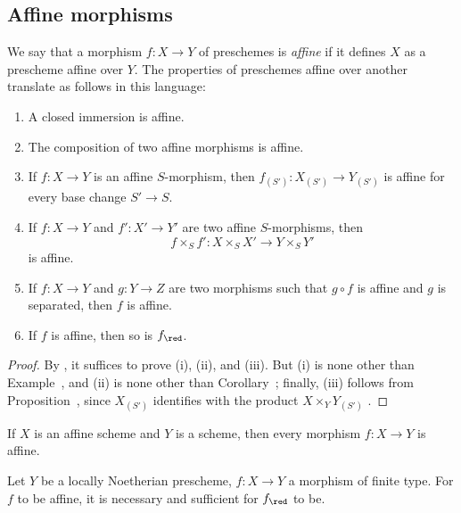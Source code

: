 \subsection{Affine morphisms}
\label{subsection:II.1.6}

\begin{env}[1.6.1]
\label{II.1.6.1}
We say that a morphism $f:X\to Y$ of preschemes is \emph{affine} if it defines $X$ as a prescheme affine over $Y$.
The properties of preschemes affine over another translate as follows in this language:
\end{env}

\begin{proposition}[1.6.2]
\label{II.1.6.2}
\medskip\noindent
\begin{enumerate}
  \item[{\rm(i)}] A closed immersion is affine.
  \item[{\rm(ii)}] The composition of two affine morphisms is affine.
  \item[{\rm(iii)}] If $f:X\to Y$ is an affine $S$-morphism, then $f_{(S')}:X_{(S')}\to Y_{(S')}$ is affine for every base change $S'\to S$.
  \item[{\rm(iv)}] If $f:X\to Y$ and $f':X'\to Y'$ are two affine $S$-morphisms, then
    \[
      f\times_S f':X\times_S X'\to Y\times_S Y'
    \]
    is affine.
  \item[{\rm(v)}] If $f:X\to Y$ and $g:Y\to Z$ are two morphisms such that $g\circ f$ is affine and $g$ is separated, then $f$ is affine.
  \item[{\rm(vi)}] If $f$ is affine, then so is $f_\red$.
\end{enumerate}
\end{proposition}

\begin{proof}
By , it suffices to prove (i), (ii), and (iii).
But (i) is none other than Example~, and (ii) is none other than Corollary~; finally, (iii) follows from Proposition~, since $X_{(S')}$ identifies with the product $X\times_Y Y_{(S')}$ .
\end{proof}

\begin{corollary}[1.6.3]
\label{II.1.6.3}
If $X$ is an affine scheme and $Y$ is a scheme, then every morphism $f:X\to Y$ is affine.
\end{corollary}

\begin{proposition}[1.6.4]
\label{II.1.6.4}
Let $Y$ be a locally Noetherian prescheme, $f:X\to Y$ a morphism of finite type.
For $f$ to be affine, it is necessary and sufficient for $f_\red$ to be.
\end{proposition}

